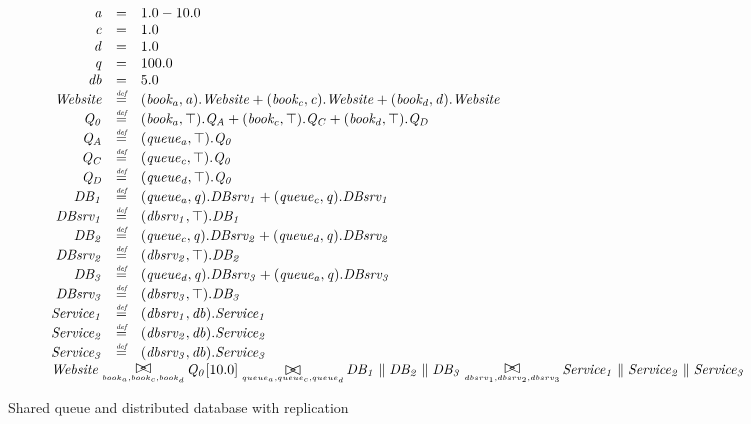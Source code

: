\begin{figure}
	\caption{Shared queue and distributed database with replication}
	\label{figure:queueddrep}
	\centering
	\begin{displaymath}
	\begin{array}{rcl}
	\mathit{a} & = & 1.0-10.0\\
	\mathit{c} & = & 1.0\\
	\mathit{d} & = & 1.0\\
	\mathit{q} & = & 100.0\\
	\mathit{db} & = & 5.0\\
	[0.0ex]		\mathit{Website} & \rmdef & (\mathit{book_a},\mathit{a}).\mathit{Website}+(\mathit{book_c},\mathit{c}).\mathit{Website}+(\mathit{book_d},\mathit{d}).\mathit{Website}\\
	\mathit{Q_0} & \rmdef & (\mathit{book_a},\top).\mathit{Q_A}+(\mathit{book_c},\top).\mathit{Q_C}+(\mathit{book_d},\top).\mathit{Q_D}\\
	\mathit{Q_A} & \rmdef & (\mathit{queue_a},\top).\mathit{Q_0}\\
	\mathit{Q_C} & \rmdef & (\mathit{queue_c},\top).\mathit{Q_0}\\
	\mathit{Q_D} & \rmdef & (\mathit{queue_d},\top).\mathit{Q_0}\\
	\mathit{DB_1} & \rmdef & (\mathit{queue_a},\mathit{q}).\mathit{DBsrv_1}+(\mathit{queue_c},\mathit{q}).\mathit{DBsrv_1}\\
	\mathit{DBsrv_1} & \rmdef & (\mathit{dbsrv_1},\top).\mathit{DB_1}\\
	\mathit{DB_2} & \rmdef & (\mathit{queue_c},\mathit{q}).\mathit{DBsrv_2}+(\mathit{queue_d},\mathit{q}).\mathit{DBsrv_2}\\
	\mathit{DBsrv_2} & \rmdef & (\mathit{dbsrv_2},\top).\mathit{DB_2}\\
	\mathit{DB_3} & \rmdef & (\mathit{queue_d},\mathit{q}).\mathit{DBsrv_3}+(\mathit{queue_a},\mathit{q}).\mathit{DBsrv_3}\\
	\mathit{DBsrv_3} & \rmdef & (\mathit{dbsrv_3},\top).\mathit{DB_3}\\
	\mathit{Service_1} & \rmdef & (\mathit{dbsrv_1},\mathit{db}).\mathit{Service_1}\\
	\mathit{Service_2} & \rmdef & (\mathit{dbsrv_2},\mathit{db}).\mathit{Service_2}\\
	\mathit{Service_3} & \rmdef & (\mathit{dbsrv_3},\mathit{db}).\mathit{Service_3}\\
	[0.0ex]		\multicolumn{3}{l}{\mathit{Website}\sync{book_a,book_c,book_d}\mathit{Q_0}[10.0]\sync{queue_a,queue_c,queue_d}\mathit{DB_1}\parallel\mathit{DB_2}\parallel\mathit{DB_3}\sync{dbsrv_1,dbsrv_2,dbsrv_3}\mathit{Service_1}\parallel\mathit{Service_2}\parallel\mathit{Service_3}}\\
	[0.0ex]	\end{array}
	\end{displaymath}
\end{figure}


